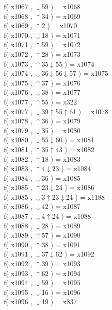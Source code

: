 f( x1067 , $\downarrow$59 ) = x1068 \\
f( x1068 , $\uparrow$34 ) = x1069 \\
f( x1069 , $\uparrow$2 ) = x1070 \\
f( x1070 , $\downarrow$18 ) = x1071 \\
f( x1071 , $\uparrow$59 ) = x1072 \\
f( x1072 , $\uparrow$28 ) = x1073 \\
f( x1073 , $\uparrow$35$\downarrow$55 ) = x1074 \\
f( x1074 , $\downarrow$36$\downarrow$56$\downarrow$57 ) = x1075 \\
f( x1075 , $\uparrow$37 ) = x1076 \\
f( x1076 , $\downarrow$38 ) = x1077 \\
f( x1077 , $\uparrow$55 ) = x322 \\
f( x1077 , $\downarrow$39$\uparrow$55$\uparrow$61 ) = x1078 \\
f( x1078 , $\uparrow$36 ) = x1079 \\
f( x1079 , $\downarrow$35 ) = x1080 \\
f( x1080 , $\downarrow$55$\downarrow$60 ) = x1081 \\
f( x1081 , $\uparrow$35$\uparrow$43 ) = x1082 \\
f( x1082 , $\uparrow$18 ) = x1083 \\
f( x1083 , $\uparrow$4$\downarrow$23 ) = x1084 \\
f( x1084 , $\downarrow$36 ) = x1085 \\
f( x1085 , $\uparrow$23$\downarrow$24 ) = x1086 \\
f( x1085 , $\downarrow$3$\uparrow$23$\downarrow$24 ) = x1188 \\
f( x1086 , $\downarrow$42 ) = x1087 \\
f( x1087 , $\downarrow$4$\uparrow$24 ) = x1088 \\
f( x1088 , $\downarrow$28 ) = x1089 \\
f( x1089 , $\uparrow$57 ) = x1090 \\
f( x1090 , $\uparrow$38 ) = x1091 \\
f( x1091 , $\downarrow$37$\downarrow$62 ) = x1092 \\
f( x1092 , $\uparrow$39 ) = x1093 \\
f( x1093 , $\uparrow$62 ) = x1094 \\
f( x1094 , $\downarrow$59 ) = x1095 \\
f( x1095 , $\downarrow$16 ) = x1096 \\
f( x1096 , $\downarrow$19 ) = x837 \\
